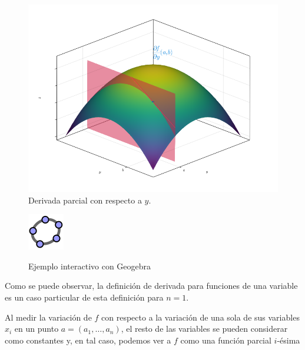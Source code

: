 \documentclass[
  a4paper,
]{scrreport}
\theoremstyle{definition}
\theoremstyle{plain}
\theoremstyle{plain}
\theoremstyle{definition}
\theoremstyle{definition}
\theoremstyle{plain}
\theoremstyle{remark}
\begin{document}
\begin{figure}

{\centering \includegraphics{./img/derivadas-funciones-varias-variables/derivada-parcial-y.png}

}

\caption{Derivada parcial con respecto a \(y\).}

\end{figure}

\begin{figure}

{\centering 

\href{https://www.geogebra.org/classic/ywur7vzr}{\includegraphics{img/logos/logo-geogebra.png}}

}

\caption{Ejemplo interactivo con Geogebra}

\end{figure}

Como se puede observar, la definición de derivada para funciones de una
variable es un caso particular de esta definición para \(n=1\).

Al medir la variación de \(f\) con respecto a la variación de una sola
de sus variables \(x_i\) en un punto \(a=(a_1,\ldots,a_n)\), el resto de
las variables se pueden considerar como constantes y, en tal caso,
podemos ver a \(f\) como una función parcial \(i\)-ésima
\end{document}
